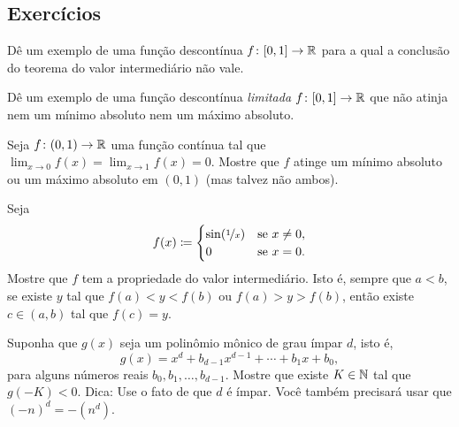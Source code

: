\begin{myfigureht}
\caption{A imagem de uma função contínua $f \colon [a,b] \to \R$.\label{fig:imageinterval}}
\end{myfigureht}

\subsection{Exercícios}

\begin{exercise}
Dê um exemplo de uma função descontínua $f \colon [0,1] \to {\mathbb{R}}$
para a qual a conclusão do teorema do valor intermediário não vale.
\end{exercise}

\begin{exercise}
Dê um exemplo de uma função descontínua \emph{limitada} $f \colon [0,1]
\to {\mathbb{R}}$ que não atinja nem um mínimo absoluto nem um máximo absoluto.
\end{exercise}

\begin{exercise}
Seja $f \colon (0,1) \to {\mathbb{R}}$ uma função contínua tal que
$\displaystyle \lim_{x\to 0} f(x) =
\displaystyle \lim_{x\to 1} f(x) = 0$. Mostre que
$f$ atinge um mínimo absoluto ou um máximo absoluto em $(0,1)$
(mas talvez não ambos).
\end{exercise}

\begin{exercise} \label{exercise:meanvaluepropsin1x}
Seja
\begin{equation*}
f(x) \coloneqq
\begin{cases}
\sin(\nicefrac{1}{x}) & \text{se } x \neq 0, \\
0 & \text{se } x=0.
\end{cases}
\end{equation*}
Mostre que $f$ tem a propriedade do valor intermediário.
Isto é, sempre que $a < b$, se existe $y$ tal que $f(a) < y < f(b)$
ou $f(a) > y > f(b)$, então
existe $c \in (a,b)$ tal que $f(c) = y$.
\end{exercise}

\begin{exercise} \label{exercise:odddegnegativeK}
Suponha que $g(x)$ seja um polinômio mônico de grau ímpar $d$, isto é,
\begin{equation*}
g(x) = x^d + b_{d-1} x^{d-1} + \cdots + b_1 x + b_0 ,
\end{equation*}
para alguns números reais $b_{0}, b_1, \ldots, b_{d-1}$. Mostre que existe
$K \in {\mathbb{N}}$ tal que $g(-K) < 0$. Dica: Use o fato de que
$d$ é ímpar. Você também precisará usar que ${(-n)}^d = -(n^d)$.
\end{exercise}

